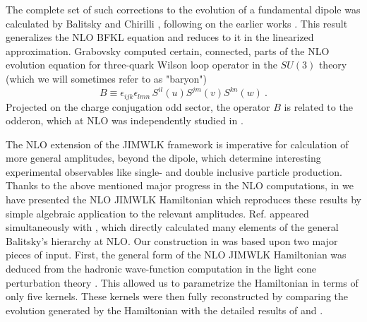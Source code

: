 \documentclass[11pt,a4paper]{article}
\begin{document}
The complete set of such corrections to the evolution of a fundamental dipole was calculated by Balitsky and Chirilli \cite{BC}, following on the earlier works \cite{BalNLO}. 
This result generalizes the NLO  BFKL equation  \cite{NLOBFKL} and reduces to it in the linearized approximation. Grabovsky \cite{Grab} computed certain, connected,
parts of the NLO evolution equation for three-quark  Wilson loop operator in the $SU(3)$ theory (which we will sometimes refer to as "baryon")
\begin{equation} B\equiv\epsilon_{ijk}\epsilon_{lmn}\,S^{il}(u)S^{jm}(v)S^{kn}(w)\ .
\end{equation}
Projected on  the charge conjugation odd sector, the  operator $B$
is related to the odderon, which  at NLO was independently studied  in \cite{NLOBKP}.

The NLO extension of the JIMWLK framework is imperative for calculation of more general amplitudes, beyond the dipole, 
which determine interesting experimental observables like single- and double inclusive particle production.  
Thanks to the above mentioned  major progress in the NLO computations, 
in \cite{nlojimwlk} we have presented the NLO JIMWLK Hamiltonian which reproduces these results by simple algebraic application to the relevant amplitudes.
Ref.\cite{nlojimwlk}  appeared simultaneously with \cite{BClast}, which directly calculated  many elements of the general 
Balitsky's hierarchy at NLO.  Our construction in \cite{nlojimwlk} was based upon  two major pieces of input. First, the general form
of the NLO JIMWLK Hamiltonian was deduced from the hadronic  wave-function computation in the light cone perturbation
theory \cite{LM}. This allowed us to parametrize the Hamiltonian in terms of only five kernels. These kernels were then fully reconstructed by comparing
the evolution generated by the Hamiltonian with the detailed results of \cite{BC} and \cite{Grab}. 
\end{document}
